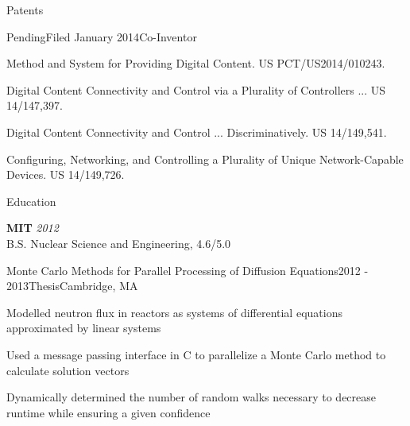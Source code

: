 \documentclass{resume}
\begin{document}
\begin{rSection}{Patents}
\begin{rSubsection}{Pending}{Filed January 2014}{Co-Inventor}{}
\item Method and System for Providing Digital Content. US PCT/US2014/010243.
\item Digital Content Connectivity and Control via a Plurality of Controllers ... US 14/147,397.
\item Digital Content Connectivity and Control ... Discriminatively. US 14/149,541.
\item Configuring, Networking, and Controlling a Plurality of Unique Network-Capable Devices. US 14/149,726.
\end{rSubsection}

\end{rSection}



\begin{rSection}{Education}

{\bf MIT} \hfill {\em 2012} \\ 
B.S. Nuclear Science and Engineering, 4.6/5.0


\begin{rSubsection}{Monte Carlo Methods for Parallel Processing of Diffusion Equations}{2012 - 2013}{Thesis}{Cambridge, MA}
\item Modelled neutron flux in reactors as systems of differential equations approximated by linear systems
\item Used a message passing interface in C to parallelize a Monte Carlo method to calculate solution vectors
\item Dynamically determined the number of random walks necessary to decrease runtime while ensuring a given confidence
\end{rSubsection}

\end{rSection}
\end{document}
